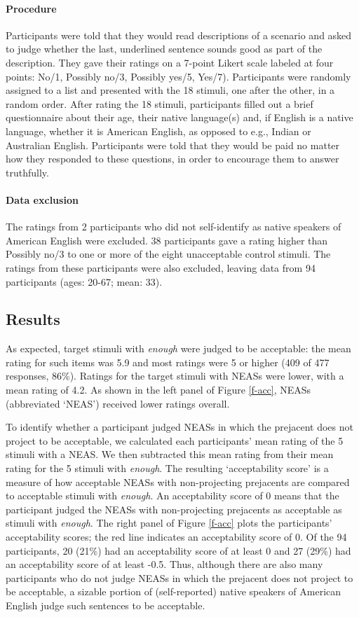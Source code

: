 \documentclass[11pt,fleqn]{article}
\newcommand{\6}{\mbox{$[\hspace*{-.6mm}[$}}
\newcommand{\9}{\mbox{$]\hspace*{-.6mm}]$}}
\begin{document}
\paragraph{Procedure} Participants were told that they would read descriptions of a scenario and asked to judge whether the last, underlined sentence sounds good as part of the description. They gave their ratings on a 7-point Likert scale
labeled at four points: No/1, Possibly no/3, Possibly yes/5,
Yes/7). Participants were randomly assigned to a list and presented with the 18 stimuli, one after the other, in a random order. After rating the 18 stimuli, participants filled out a brief questionnaire about their age, their native language(s) and, if English is a native language, whether it is American English, as opposed to e.g., Indian or Australian English.
Participants were told that they would be paid no matter how they
responded to these questions, in order to encourage them to answer
truthfully.


\paragraph{Data exclusion} 

The ratings from 2 participants who did not self-identify as native speakers of American English were excluded. 38 participants gave a rating higher than Possibly no/3 to one or more of the eight unacceptable control stimuli. The ratings from these participants were also excluded, leaving data from 94 participants (ages: 20-67; mean: 33). 

\subsection{Results}

As expected, target stimuli with {\em enough} were judged to be acceptable: the mean rating for such items was 5.9 and most ratings were 5 or higher (409 of 477 responses,
86\%). Ratings for the target stimuli with NEASs were lower, with a mean rating of 4.2. As shown in the left panel of Figure \ref{f-acc}, NEASs (abbreviated `NEAS') received lower ratings overall.

To identify whether a participant judged NEASs in which the prejacent does not project to be acceptable, we calculated each participants' mean rating of the 5 stimuli with a NEAS. We then subtracted this mean rating from their mean rating for the 5 stimuli with {\em enough}. The resulting `acceptability score' is a measure of how acceptable NEASs with non-projecting prejacents are compared to acceptable stimuli with {\em enough}. An acceptability score of 0 means that the participant judged the NEASs with non-projecting prejacents as acceptable as stimuli with {\em enough}. The right panel of Figure \ref{f-acc} plots the participants' acceptability scores; the red line indicates an acceptability score of 0. Of the 94 participants, 20 (21\%) had an acceptability score of at least 0 and 27 (29\%) had an acceptability score of at least -0.5. Thus, although there are also many participants who do not judge NEASs in which the prejacent does not project to be acceptable, a sizable portion of (self-reported) native speakers of American English judge such sentences to be acceptable.
\end{document}
